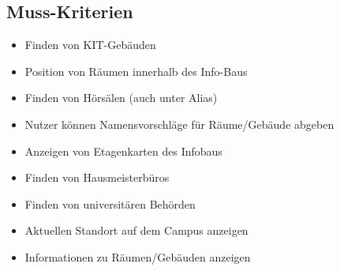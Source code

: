 \subsection{Muss-Kriterien}

\begin{itemize}

    \item Finden von KIT-Gebäuden
    \item Position von Räumen innerhalb des Info-Baus
    \item Finden von Hörsälen (auch unter Alias)
    \item Nutzer können Namensvorschläge für Räume/Gebäude abgeben
    \item Anzeigen von Etagenkarten des Infobaus
    \item Finden von Hausmeisterbüros
    \item Finden von universitären Behörden
    \item Aktuellen Standort auf dem Campus anzeigen
    \item Informationen zu Räumen/Gebäuden anzeigen


\end{itemize}
